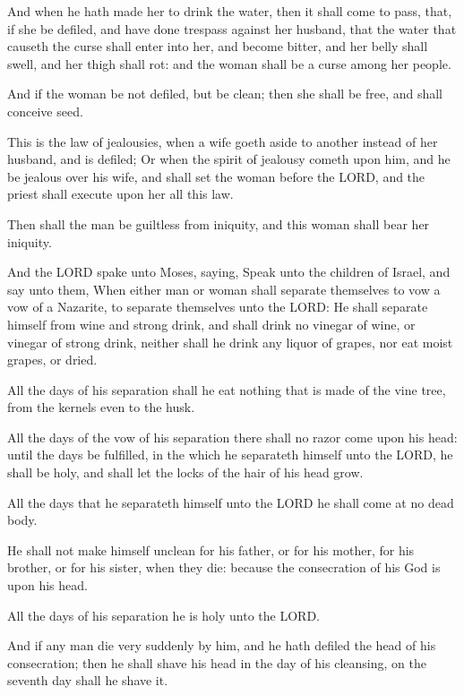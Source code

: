 \Verse And when he hath made her to drink the water, then it shall come
to pass, that, if she be defiled, and have done trespass against her
husband, that the water that causeth the curse shall enter into her,
and become bitter, and her belly shall swell, and her thigh shall rot:
and the woman shall be a curse among her people.

\Verse And if the woman be not defiled, but be clean; then she shall be
free, and shall conceive seed.

\Verse This is the law of jealousies, when a wife goeth aside to another
instead of her husband, and is defiled; \Verse Or when the spirit of
jealousy cometh upon him, and he be jealous over his wife, and shall
set the woman before the LORD, and the priest shall execute upon her
all this law.

\Verse Then shall the man be guiltless from iniquity, and this woman
shall bear her iniquity.


\Chapter
\Verse And the LORD spake unto Moses, saying, \Verse Speak unto the children
of Israel, and say unto them, When either man or woman shall separate
themselves to vow a vow of a Nazarite, to separate themselves unto the
LORD: \Verse He shall separate himself from wine and strong drink, and
shall drink no vinegar of wine, or vinegar of strong drink, neither
shall he drink any liquor of grapes, nor eat moist grapes, or dried.

\Verse All the days of his separation shall he eat nothing that is made
of the vine tree, from the kernels even to the husk.

\Verse All the days of the vow of his separation there shall no razor
come upon his head: until the days be fulfilled, in the which he
separateth himself unto the LORD, he shall be holy, and shall let the
locks of the hair of his head grow.

\Verse All the days that he separateth himself unto the LORD he shall
come at no dead body.

\Verse He shall not make himself unclean for his father, or for his
mother, for his brother, or for his sister, when they die: because the
consecration of his God is upon his head.

\Verse All the days of his separation he is holy unto the LORD.

\Verse And if any man die very suddenly by him, and he hath defiled the
head of his consecration; then he shall shave his head in the day of
his cleansing, on the seventh day shall he shave it.

